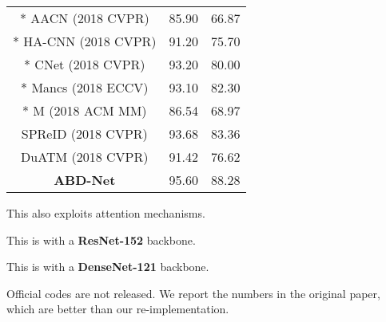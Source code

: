 \documentclass[10pt,twocolumn]{article}
\begin{document}
\begin{table}[ht]
\begin{center}
\begin{threeparttable}
{\begin{tabular}{c|c|c}
* AACN \cite{xu2018attention} (2018 CVPR) & 85.90 & 66.87 \\
* HA-CNN \cite{Li_2018} (2018 CVPR) & 91.20 & 75.70 \\
* CNet \cite{Liu_2018} (2018 CVPR) & 93.20 & 80.00 \\
* Mancs \cite{wang2018mancs} (2018 ECCV) & 93.10 & 82.30\\
* M \cite{han2018attribute} (2018 ACM MM) & 86.54 & 68.97 \\
\hline
\hline
 SPReID \cite{kalayeh2018human} (2018 CVPR) & 93.68 & 83.36 \\
  DuATM \cite{Si_2018} (2018 CVPR) & 91.42 & 76.62\\
\hline
\hline
\textbf{ABD-Net} & {\color{red}95.60} & {\color{red}88.28} \\
\hline
\end{tabular}}
\begin{tablenotes}
\footnotesize
\item[] This also exploits attention mechanisms.
\item[] This is with a \textbf{ResNet-152} backbone.
\item[] This is with a \textbf{DenseNet-121} backbone.
\item[] Official codes are not released. We report the numbers in the original paper, which are better than our re-implementation. 
\end{tablenotes}
\end{threeparttable}
\end{center}
\vspace{-4mm}
\end{table}
\end{document}
